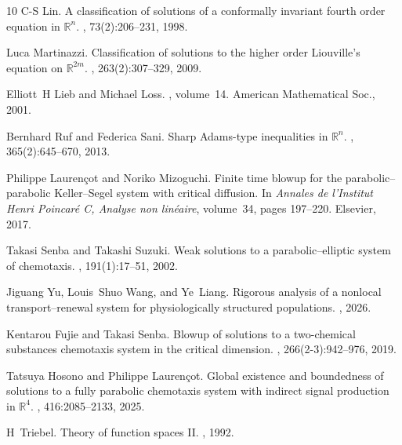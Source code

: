 \documentclass[11pt,reqno]{amsart}
\theoremstyle{definition}
\theoremstyle{remark}
\begin{document}
\begin{thebibliography}{10}
C-S Lin.
\newblock A classification of solutions of a conformally invariant fourth order equation in $\mathbb{R}^n$.
, 73(2):206--231, 1998.

Luca Martinazzi.
\newblock Classification of solutions to the higher order {L}iouville’s equation on $\mathbb{R}^{2m}$.
, 263(2):307--329, 2009.

Elliott~H Lieb and Michael Loss.
, volume~14.
\newblock American Mathematical Soc., 2001.

Bernhard Ruf and Federica Sani.
\newblock Sharp {A}dams-type inequalities in $\mathbb R^n$.
, 365(2):645--670, 2013.

Philippe Lauren{\c{c}}ot and Noriko Mizoguchi.
\newblock Finite time blowup for the parabolic--parabolic {K}eller--{S}egel system with critical diffusion.
\newblock In {\em Annales de l'Institut Henri Poincar{\'e} C, Analyse non lin{\'e}aire}, volume~34, pages 197--220. Elsevier, 2017.

Takasi Senba and Takashi Suzuki.
\newblock Weak solutions to a parabolic--elliptic system of chemotaxis.
, 191(1):17--51, 2002.

Jiguang Yu, Louis~Shuo Wang, and Ye~Liang.
\newblock Rigorous analysis of a nonlocal transport–renewal system for physiologically structured populations.
, 2026.

Kentarou Fujie and Takasi Senba.
\newblock Blowup of solutions to a two-chemical substances chemotaxis system in the critical dimension.
, 266(2-3):942--976, 2019.

Tatsuya Hosono and Philippe Lauren{\c{c}}ot.
\newblock Global existence and boundedness of solutions to a fully parabolic chemotaxis system with indirect signal production in $\mathbb{R}^4$.
, 416:2085--2133, 2025.

H~Triebel.
\newblock Theory of function spaces {I}{I}.
, 1992.


\end{thebibliography}
\end{document}
